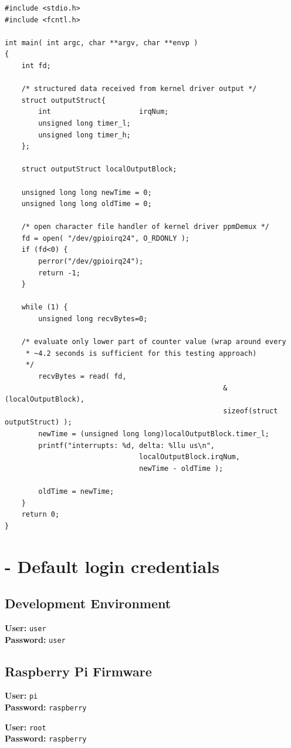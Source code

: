 \begin{lstlisting}[caption={[Source code listing of getPpmDemuxValues.c]Complete soure code of the test file \texttt{getPpmDemuxValues.c} to read the output of the proof-of-concept kernel driver \texttt{ppmDemux}.},label=code:append-ppmDemuxCode:ppmDemusReader]
#include <stdio.h>
#include <fcntl.h>

int main( int argc, char **argv, char **envp )
{
    int fd;

    /* structured data received from kernel driver output */
    struct outputStruct{
        int 					irqNum;
        unsigned long timer_l;
        unsigned long timer_h;
    };

    struct outputStruct localOutputBlock;
    
    unsigned long long newTime = 0;
    unsigned long long oldTime = 0;

    /* open character file handler of kernel driver ppmDemux */    
    fd = open( "/dev/gpioirq24", O_RDONLY );
    if (fd<0) {
        perror("/dev/gpioirq24");
        return -1;
    }

    while (1) {
        unsigned long recvBytes=0;

	/* evaluate only lower part of counter value (wrap around every 
	 * ~4.2 seconds is sufficient for this testing approach) 
	 */
        recvBytes = read( fd, 
													&(localOutputBlock), 
													sizeof(struct outputStruct) );
        newTime = (unsigned long long)localOutputBlock.timer_l; 
        printf("interrupts: %d, delta: %llu us\n",
								localOutputBlock.irqNum, 
								newTime - oldTime );

        oldTime = newTime;
    }
    return 0;
}

\end{lstlisting}

\chapter{- Default login credentials}
\label{sec:d-credentials}

\section{Development Environment}
\label{sec:d-credentials:vm}
\textbf{User:} \texttt{user}\\
\textbf{Password:} \texttt{user}

\section{Raspberry Pi Firmware}
\label{sec:d-credentials:rpi}
\textbf{User:} \texttt{pi}\\
\textbf{Password:} \texttt{raspberry}

\textbf{User:} \texttt{root}\\
\textbf{Password:} \texttt{raspberry}
